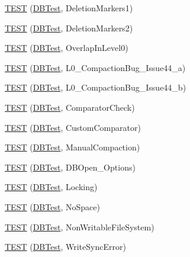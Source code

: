 \begin{DoxyCompactItemize}
\item 
\hyperlink{namespaceleveldb_a216168df3713bb71f35038d91b5224f0}{T\+E\+S\+T} (\hyperlink{classleveldb_1_1_d_b_test}{D\+B\+Test}, Deletion\+Markers1)
\item 
\hyperlink{namespaceleveldb_a4188787b0b1e1e25475a2983374065b6}{T\+E\+S\+T} (\hyperlink{classleveldb_1_1_d_b_test}{D\+B\+Test}, Deletion\+Markers2)
\item 
\hyperlink{namespaceleveldb_a4fa4ffaab998ba44a1745937c1e9c55c}{T\+E\+S\+T} (\hyperlink{classleveldb_1_1_d_b_test}{D\+B\+Test}, Overlap\+In\+Level0)
\item 
\hyperlink{namespaceleveldb_a46665ff2f4f9bd25167f82d3be16f8b2}{T\+E\+S\+T} (\hyperlink{classleveldb_1_1_d_b_test}{D\+B\+Test}, L0\+\_\+\+Compaction\+Bug\+\_\+\+Issue44\+\_\+a)
\item 
\hyperlink{namespaceleveldb_a727df67090c63a0ca4b2effdc90a3da1}{T\+E\+S\+T} (\hyperlink{classleveldb_1_1_d_b_test}{D\+B\+Test}, L0\+\_\+\+Compaction\+Bug\+\_\+\+Issue44\+\_\+b)
\item 
\hyperlink{namespaceleveldb_a5cd6c2754610c66f4dd998874482c80b}{T\+E\+S\+T} (\hyperlink{classleveldb_1_1_d_b_test}{D\+B\+Test}, Comparator\+Check)
\item 
\hyperlink{namespaceleveldb_a38772a8b86ea7658430b1fa2f1a5d83e}{T\+E\+S\+T} (\hyperlink{classleveldb_1_1_d_b_test}{D\+B\+Test}, Custom\+Comparator)
\item 
\hyperlink{namespaceleveldb_a34a511836c47efe81202280115290934}{T\+E\+S\+T} (\hyperlink{classleveldb_1_1_d_b_test}{D\+B\+Test}, Manual\+Compaction)
\item 
\hyperlink{namespaceleveldb_a88d6fdcb16ed4edc65da40f383e6f23b}{T\+E\+S\+T} (\hyperlink{classleveldb_1_1_d_b_test}{D\+B\+Test}, D\+B\+Open\+\_\+\+Options)
\item 
\hyperlink{namespaceleveldb_a8470163c7e8b292085a5b60f989dc828}{T\+E\+S\+T} (\hyperlink{classleveldb_1_1_d_b_test}{D\+B\+Test}, Locking)
\item 
\hyperlink{namespaceleveldb_a11f56de4abca34391c0e60f311262b65}{T\+E\+S\+T} (\hyperlink{classleveldb_1_1_d_b_test}{D\+B\+Test}, No\+Space)
\item 
\hyperlink{namespaceleveldb_a9d69b380c464519a1b946fb1faa21cbd}{T\+E\+S\+T} (\hyperlink{classleveldb_1_1_d_b_test}{D\+B\+Test}, Non\+Writable\+File\+System)
\item 
\hyperlink{namespaceleveldb_ab30f3608fe480a765f28f713415b7fe4}{T\+E\+S\+T} (\hyperlink{classleveldb_1_1_d_b_test}{D\+B\+Test}, Write\+Sync\+Error)
\item 

\end{DoxyCompactItemize}
